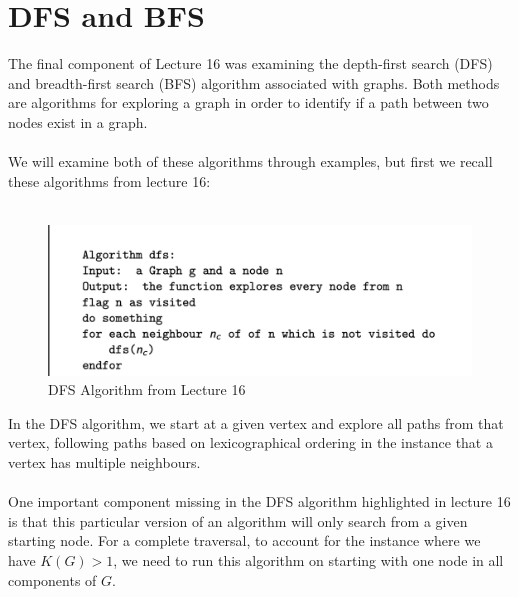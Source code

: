 \documentclass[11pt,reqno]{amsart}
\theoremstyle{definition}
\numberwithin{equation}{section}
\begin{document}
\pagebreak
\section{DFS and BFS}
\noindent The final component of Lecture 16 was examining the depth-first search (DFS) and breadth-first search (BFS) algorithm associated with graphs. Both methods are algorithms for exploring a graph in order to identify if a path between two nodes exist in a graph.\\
\\
We will examine both of these algorithms through examples, but first we recall these algorithms from lecture 16:\\
\\

\begin{figure}[h!]
	\centering
	\includegraphics[width=0.5\linewidth]{dfs}
	\caption{DFS Algorithm from Lecture 16}
	\label{fig:Konigsberg}
\end{figure}
\noindent In the DFS algorithm, we start at a given vertex and explore all paths from that vertex, following paths based on lexicographical ordering in the instance that a vertex has multiple neighbours.\\
\\
One important component missing in the DFS algorithm highlighted in lecture 16 is that this particular version of an algorithm will only search from a given starting node. For a complete traversal, to account for the instance where we have $K(G)>1$, we need to run this algorithm on starting with one node in all components of $G$.
\\
\pagebreak
\end{document}
